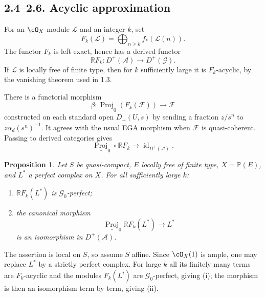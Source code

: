 \documentclass[11pt]{article}
\theoremstyle{plain}
\newtheorem{proposition}[theorem]{Proposition}
\theoremstyle{definition}
\theoremstyle{remark}
\newcommand{\RR}{\mathbb R}
\DeclareMathOperator{\Proj}{Proj}
\DeclareMathOperator{\id}{id}
\begin{document}
\subsection*{2.4--2.6. Acyclic approximation}
For an $\cO_X$-module $\mathcal L$ and an integer $k$, set
\begin{equation}\label{eq:VI.2.4.1}
F_k(\mathcal L)=\bigoplus_{n\geq k}f_*(\mathcal L(n)).
\end{equation}
The functor $F_k$ is left exact, hence has a derived functor
\begin{equation}\label{eq:VI.2.4.2}
\RR F_k:D^+(\mathcal A)\longrightarrow D^+(\mathcal G).
\end{equation}
If $\mathcal L$ is locally free of finite type, then for $k$ sufficiently large it is $F_k$-acyclic, by the vanishing theorem used in 1.3.

There is a functorial morphism
\begin{equation}\label{eq:VI.2.5.1}
\beta:\underline{\Proj}_0(F_k(\mathcal F))\longrightarrow\mathcal F
\end{equation}
constructed on each standard open $D_+(U,s)$ by sending a fraction $z/s^n$ to $z\alpha_d(s^n)^{-1}$. It agrees with the usual EGA morphism when $\mathcal F$ is quasi-coherent. Passing to derived categories gives
\begin{equation}\label{eq:VI.2.5.3}
\underline{\Proj}_0\circ\RR F_k\longrightarrow \id_{D^+(\mathcal A)}.
\end{equation}

\begin{proposition}\label{prop:VI.2.6}
Let $S$ be quasi-compact, $E$ locally free of finite type, $X=\mathbb P(E)$, and $L^*$ a perfect complex on $X$. For all sufficiently large $k$:
\begin{enumerate}[label=(\roman*)]
\item $\RR F_k(L^*)$ is $\mathcal G_0$-perfect;
\item the canonical morphism
\[
\underline{\Proj}_0\RR F_k(L^*)\longrightarrow L^*
\]
is an isomorphism in $D^+(\mathcal A)$.
\end{enumerate}
\end{proposition}

The assertion is local on $S$, so assume $S$ affine. Since $\cO_X(1)$ is ample, one may replace $L^*$ by a strictly perfect complex. For large $k$ all its finitely many terms are $F_k$-acyclic and the modules $F_k(L^i)$ are $\mathcal G_0$-perfect, giving (i); the morphism is then an isomorphism term by term, giving (ii).
\end{document}
